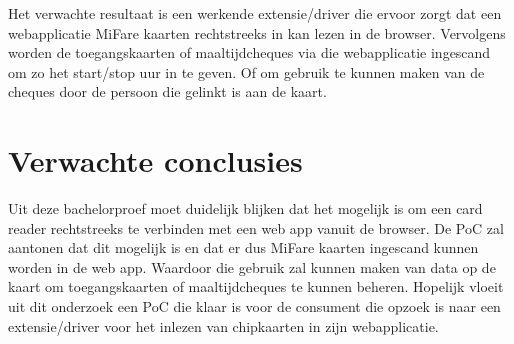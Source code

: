 Het verwachte resultaat is een werkende extensie/driver die ervoor zorgt dat een webapplicatie MiFare kaarten rechtstreeks in kan lezen in de browser. Vervolgens worden de toegangskaarten of maaltijdcheques via die webapplicatie ingescand om zo het start/stop uur in te geven. Of om gebruik te kunnen maken van de cheques door de persoon die gelinkt is aan de kaart.

\section{Verwachte conclusies}%
\label{sec:Verwachte_conclusies}

Uit deze bachelorproef moet duidelijk blijken dat het mogelijk is om een card reader rechtstreeks te verbinden met een web app vanuit de browser. De PoC zal aantonen dat dit mogelijk is en dat er dus MiFare kaarten ingescand kunnen worden in de web app. Waardoor die gebruik zal kunnen maken van data op de kaart om toegangskaarten of maaltijdcheques te kunnen beheren. Hopelijk vloeit uit dit onderzoek een PoC die klaar is voor de consument die opzoek is naar een extensie/driver voor het inlezen van chipkaarten in zijn webapplicatie.